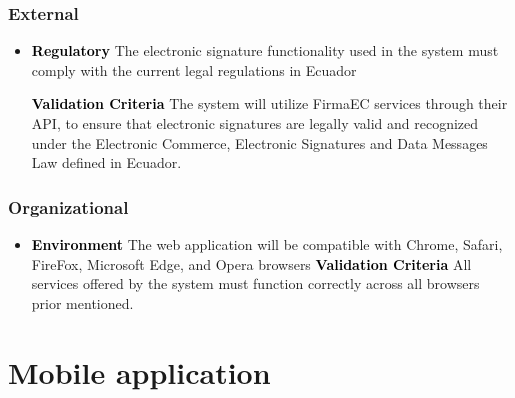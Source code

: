 \documentclass{scrreprt}
\begin{document}
\subsubsection{External}

\begin{itemize}

\item \textcolor{black}{\textbf {Regulatory}} \newline
The electronic signature functionality used in the system must comply with the current legal regulations in Ecuador \newline


\textcolor{black}{\textbf {Validation Criteria}} \newline
The system will utilize FirmaEC services through their API, to ensure that electronic signatures are legally valid and recognized under the Electronic Commerce, Electronic Signatures and Data Messages Law defined in Ecuador.


\end{itemize}
\subsubsection{Organizational}

\begin{itemize}
    \item \textcolor{black}{\textbf {Environment}} \newline
    The web application will be compatible with Chrome, Safari, FireFox, Microsoft Edge, and Opera browsers \newline \newline
 \textcolor{black}{\textbf {Validation Criteria}} \newline
 All services offered by the system must function correctly across all browsers prior mentioned.\newline
 
\end{itemize}

\section{Mobile application}

\setcounter{secnumdepth}{3}
\renewcommand\thesubsubsection{\thesection.\arabic{subsubsection}}
\end{document}
